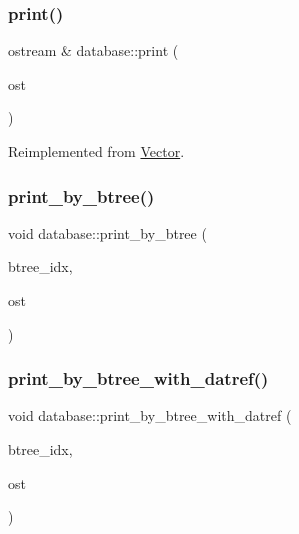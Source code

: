 \subsubsection{\texorpdfstring{print()}{print()}}
{\footnotesize\ttfamily ostream \& database\+::print (\begin{DoxyParamCaption}\item[{ostream \&}]{ost }\end{DoxyParamCaption})\hspace{0.3cm}{\ttfamily [virtual]}}



Reimplemented from \mbox{\hyperlink{class_vector_a71d7e24bcfdfc69d4a2137360acb066c}{Vector}}.

\mbox{\label{classdatabase_ac45ae44f2a861557ced6e5ab7c146717}} 
\subsubsection{\texorpdfstring{print\+\_\+by\+\_\+btree()}{print\_by\_btree()}}
{\footnotesize\ttfamily void database\+::print\+\_\+by\+\_\+btree (\begin{DoxyParamCaption}\item[{\mbox{\hyperlink{galois_8h_a09fddde158a3a20bd2dcadb609de11dc}{I\+NT}}}]{btree\+\_\+idx,  }\item[{ostream \&}]{ost }\end{DoxyParamCaption})}

\mbox{\label{classdatabase_af84030a29b31944d6763974ac4f774b5}} 
\subsubsection{\texorpdfstring{print\+\_\+by\+\_\+btree\+\_\+with\+\_\+datref()}{print\_by\_btree\_with\_datref()}}
{\footnotesize\ttfamily void database\+::print\+\_\+by\+\_\+btree\+\_\+with\+\_\+datref (\begin{DoxyParamCaption}\item[{\mbox{\hyperlink{galois_8h_a09fddde158a3a20bd2dcadb609de11dc}{I\+NT}}}]{btree\+\_\+idx,  }\item[{ostream \&}]{ost }\end{DoxyParamCaption})}

